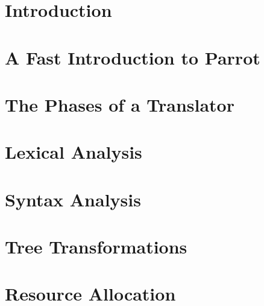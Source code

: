 \documentclass[times, 10pt,%
]{article}
\begin{document}
\section{Introduction}
\label{section:introduction}


\section{A Fast Introduction to Parrot}
\label{section:parrot}


\section{The Phases of a Translator}
\label{section:phases}


\section{Lexical Analysis}
\label{section:lexicalanalysis}


%

\section{Syntax Analysis}
\label{section:syntacticanalysis}



\section{Tree Transformations}
\label{section:machineindependentoptimizations}



\section{Resource Allocation}
\label{section:addressassign}

\end{document}
